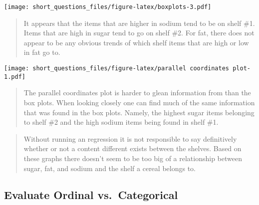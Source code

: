 \documentclass[
  11pt,
]{article}
\newenvironment{Shaded}{\begin{snugshade}}{\end{snugshade}}
\newcommand{\AttributeTok}[1]{\textcolor[rgb]{0.77,0.63,0.00}{#1}}
\newcommand{\ConstantTok}[1]{\textcolor[rgb]{0.00,0.00,0.00}{#1}}
\newcommand{\DecValTok}[1]{\textcolor[rgb]{0.00,0.00,0.81}{#1}}
\newcommand{\FunctionTok}[1]{\textcolor[rgb]{0.00,0.00,0.00}{#1}}
\newcommand{\NormalTok}[1]{#1}
\newcommand{\OtherTok}[1]{\textcolor[rgb]{0.56,0.35,0.01}{#1}}
\newcommand{\SpecialCharTok}[1]{\textcolor[rgb]{0.00,0.00,0.00}{#1}}
\newcommand{\StringTok}[1]{\textcolor[rgb]{0.31,0.60,0.02}{#1}}
\begin{document}
\texttt{[image: short\_questions\_files/figure-latex/boxplots-3.pdf]}

\begin{quote}
It appears that the items that are higher in sodium tend to be on shelf
\#1. Items that are high in sugar tend to go on shelf \#2. For fat,
there does not appear to be any obvious trends of which shelf items that
are high or low in fat go to.
\end{quote}

\begin{Shaded}
\end{Shaded}

\texttt{[image: short\_questions\_files/figure-latex/parallel coordinates plot-1.pdf]}

\begin{quote}
The parallel coordinates plot is harder to glean information from than
the box plots. When looking closely one can find much of the same
information that was found in the box plots. Namely, the highest sugar
items belonging to shelf \#2 and the high sodium items being found in
shelf \#1.
\end{quote}

\begin{quote}
Without running an regression it is not responsible to say definitively
whether or not a content different exists between the shelves. Based on
these graphs there doesn't seem to be too big of a relationship between
sugar, fat, and sodium and the shelf a cereal belongs to.
\end{quote}

\hypertarget{evaluate-ordinal-vs.-categorical}{%
\subsection{Evaluate Ordinal
vs.~Categorical}\label{evaluate-ordinal-vs.-categorical}}
\end{document}
